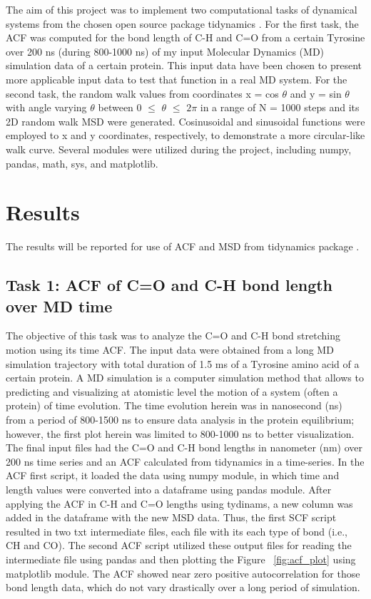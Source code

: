 \documentclass{article}
\begin{document}
The aim of this project was to implement two computational tasks of dynamical systems from the chosen open source package tidynamics \cite{Buyl2018}. For the first task, the ACF was computed for the bond length of C-H and C=O from a certain Tyrosine over 200 ns (during 800-1000 ns) of my input Molecular Dynamics (MD) simulation data of a certain protein. This input data have been chosen to present more applicable input data to test that function in a real MD system. For the second task, the random walk values from coordinates x = cos $\theta$ and y = sin $\theta$ with angle varying $\theta$ between 0 $\leq$ $\theta$ $\leq$ $2\pi$ in a range of N = 1000 steps and its 2D random walk MSD were generated. Cosinusoidal and sinusoidal functions were employed to x and y coordinates, respectively, to demonstrate a more circular-like walk curve. Several modules were utilized during the project, including numpy, pandas, math, sys, and matplotlib.

\section{Results}

The results will be reported for use of ACF and MSD from tidynamics package \cite{Buyl2018}.

\subsection{Task 1: ACF of C=O and C-H bond length over MD time}

The objective of this task was to analyze the C=O and C-H bond stretching motion using its time ACF. The input data were obtained from a long MD simulation trajectory with total duration of 1.5 ms of a Tyrosine amino acid of a certain protein. A MD simulation is a computer simulation method that allows to predicting and visualizing at atomistic level the motion of a system (often a protein) of time evolution. The time evolution herein was in nanosecond (ns) from a period of 800-1500 ns to ensure data analysis in the protein equilibrium; however, the first plot herein was limited to 800-1000 ns to better visualization. The final input files had the C=O and C-H bond lengths in nanometer (nm) over 200 ns time series and an ACF calculated from tidynamics \cite{Buyl2018} in a time-series. In the ACF first script, it loaded the data using numpy module, in which time and length values were converted into a dataframe using pandas module. After applying the ACF in C-H and C=O lengths using tydinams, a new column was added in the dataframe with the new MSD data. Thus, the first SCF script resulted in two txt intermediate files, each file with its each type of bond (i.e., CH and CO). The second ACF script utilized these output files for reading the intermediate file using pandas and then plotting the Figure ~\ref{fig:acf_plot} using matplotlib module. The ACF showed near zero positive autocorrelation for those bond length data, which do not vary drastically over a long period of simulation.
\end{document}
